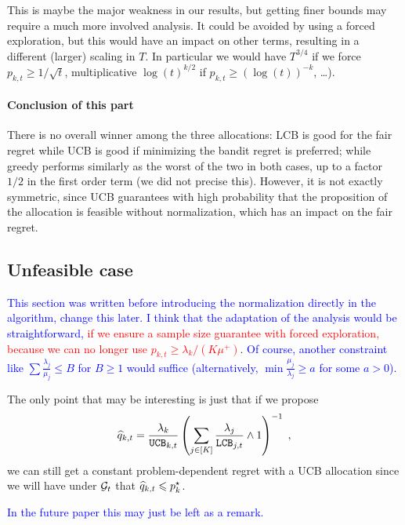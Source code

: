 \begin{remark} 
	This is maybe the major weakness in our results, but getting finer bounds may require a much more involved analysis. It could be avoided by using a forced exploration, but this would have an impact on other terms, resulting in a different (larger) scaling in $T$. In particular we would have $T^{3/4}$ if we force $p_{k,t}\geq 1/\sqrt{t}$, multiplicative $\log(t)^{k/2}$ if $p_{k,t}\geq (\log(t))^{-k}$, \dots). 
\end{remark}

\paragraph{Conclusion of this part} There is no overall winner among the three allocations: LCB is good for the fair regret while UCB is good if minimizing the bandit regret is preferred; while greedy performs similarly as the worst of the two in both cases, up to a factor $1/2$ in the first order term (we did not precise this). However, it is not exactly symmetric, since UCB guarantees with high probability that the proposition of the allocation is feasible without normalization, which has an impact on the fair regret.


\subsection{Unfeasible case}

\textcolor{blue}{This section was written before introducing the normalization directly in the algorithm, change this later. I think that the adaptation of the analysis would be straightforward,} \textcolor{red}{if we ensure a sample size guarantee with forced exploration, because we can no longer use $p_{k,t}\geq \lambda_k/(K\mu^+)$}. \textcolor{blue}{Of course, another constraint like $\sum \frac{\lambda_j}{\mu_j}\leq B$ for $B\geq 1$ would suffice (alternatively, $\min \frac{\mu_j}{\lambda_j}\geq a$ for some $a>0$).}

The only point that may be interesting is just that if we propose 
	\[ \widehat{q}_{k, t} = \frac{\lambda_k}{\texttt{UCB}_{k,t}} \left(\sum_{j \in [K]}\frac{\lambda_j}{\texttt{LCB}_{j,t}}\wedge1 \right)^{-1} \;, \]
	we can still get a constant problem-dependent regret with a UCB allocation since we will have under $\mathcal{G}_t$ that $\widehat{q}_{k, t} \leqslant p_k^\star$.
	
\textcolor{blue}{In the future paper this may just be left as a remark.}

